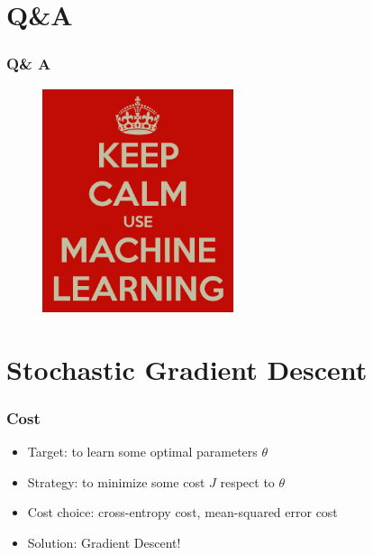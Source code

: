 \documentclass{beamer}
\begin{document}
\section*{Q\&A}
\begin{frame}
  \frametitle{Q\& A}
  \begin{figure}
    \centering
    \includegraphics[width=0.5\textwidth]{machine_learning_logo.png}
  \end{figure}
\end{frame}



\section{Stochastic Gradient Descent}

\begin{frame}
  \frametitle{Cost}
  \begin{itemize}
    \item Target: to learn some optimal parameters $\theta$
    \item Strategy: to minimize some cost $J$ respect to $\theta$
    \item Cost choice: cross-entropy cost, mean-squared error cost
    \item Solution: Gradient Descent!
  \end{itemize}
\end{frame}
\end{document}
